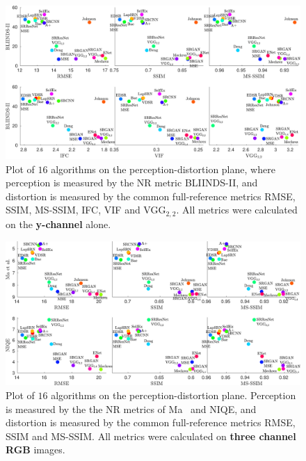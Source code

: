 \begin{figure}
	\begin{center}
		\includegraphics[width=\linewidth]{supp_figures/BLIINDS.pdf}
	\end{center}
	\caption{Plot of $16$ algorithms on the perception-distortion plane, where perception is measured by the NR metric BLIINDS-II, and distortion is measured by the common full-reference metrics RMSE, SSIM, MS-SSIM, IFC, VIF and VGG$_{2,2}$. All metrics were calculated on the \textbf{y-channel} alone.}
	\label{fig:noRefMethods5}
\end{figure}

\begin{figure}
	\begin{center}
		\includegraphics[width=\linewidth]{supp_figures/SR_NIQE_RGB.pdf}
	\end{center}
	\caption{Plot of $16$ algorithms on the perception-distortion plane. Perception is measured by the the NR metrics of Ma \etal~and NIQE, and distortion is measured by the common full-reference metrics RMSE, SSIM and MS-SSIM. All metrics were calculated on \textbf{three channel RGB} images.}
	\label{fig:noRefMethods6}
\end{figure}

